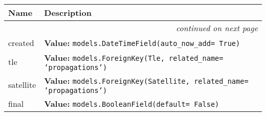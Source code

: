     \vspace{-1cm}
\hspace{\varindent}\begin{longtable}{|p{\varnamewidth}|p{\vardescrwidth}|l}
\cline{1-2}
\cline{1-2} \centering \textbf{Name} & \centering \textbf{Description}& \\
\cline{1-2}
\endhead\cline{1-2}\multicolumn{3}{r}{\small\textit{continued on next page}}\\\endfoot\cline{1-2}
\endlastfoot\raggedright c\-r\-e\-a\-t\-e\-d\- & \raggedright \textbf{Value:} 
{\tt models.DateTimeField(auto\_now\_add= True)}&\\
\cline{1-2}
\raggedright t\-l\-e\- & \raggedright \textbf{Value:} 
{\tt models.ForeignKey(Tle, related\_name= 'propagations')}&\\
\cline{1-2}
\raggedright s\-a\-t\-e\-l\-l\-i\-t\-e\- & \raggedright \textbf{Value:} 
{\tt models.ForeignKey(Satellite, related\_name= 'propagations')}&\\
\cline{1-2}
\raggedright f\-i\-n\-a\-l\- & \raggedright \textbf{Value:} 
{\tt models.BooleanField(default= False)}&\\
\cline{1-2}
\end{longtable}

